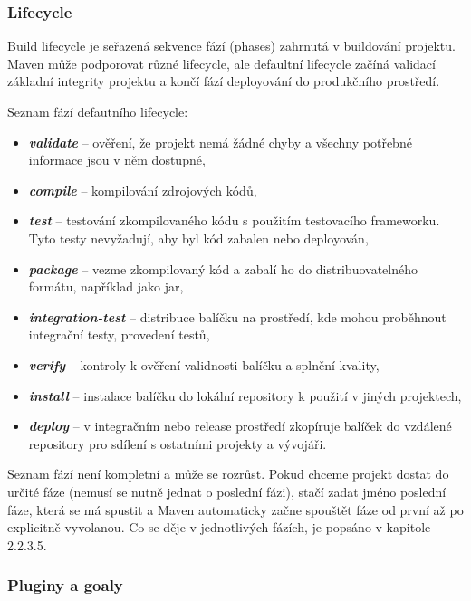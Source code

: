 \documentclass[11pt,twoside,a4paper]{book}
\begin{document}
\subsubsection{Lifecycle}

Build lifecycle je seřazená sekvence fází (phases) zahrnutá v buildování projektu. Maven
může podporovat různé lifecycle, ale defaultní lifecycle začíná validací základní integrity
projektu a končí fází deployování do produkčního prostředí.

Seznam fází defautního lifecycle:

\begin{itemize}
  \item \textbf{\textit{validate}} – ověření, že projekt nemá žádné
  chyby a všechny potřebné informace jsou v něm dostupné,
  \item \textbf{\textit{compile}} – kompilování zdrojových kódů,
  \item \textbf{\textit{test}} – testování zkompilovaného kódu s použitím
  testovacího frameworku. Tyto testy nevyžadují, aby byl kód zabalen nebo deployován,
  \item \textbf{\textit{package}} – vezme zkompilovaný kód a zabalí ho do
  distribuovatelného formátu, například jako jar,
\item \textbf{\textit{integration-test}} – distribuce balíčku na
prostředí, kde mohou proběhnout integrační testy, provedení testů,
\item \textbf{\textit{verify}} – kontroly k ověření validnosti balíčku a
splnění kvality,
\item \textbf{\textit{install}} – instalace balíčku do lokální repository
k použití v jiných projektech,
\item \textbf{\textit{deploy}} – v integračním nebo release prostředí
zkopíruje balíček do vzdálené repository pro sdílení s ostatními projekty a vývojáři.
\end{itemize}

Seznam fází není kompletní a může se rozrůst. Pokud chceme projekt dostat do určité fáze
(nemusí se nutně jednat o poslední fázi), stačí zadat jméno poslední fáze, která se má spustit a
Maven automaticky začne spouštět fáze od první až po explicitně vyvolanou. Co se děje v
jednotlivých fázích, je popsáno v kapitole 2.2.3.5.

\subsubsection{Pluginy a goaly}
\end{document}

